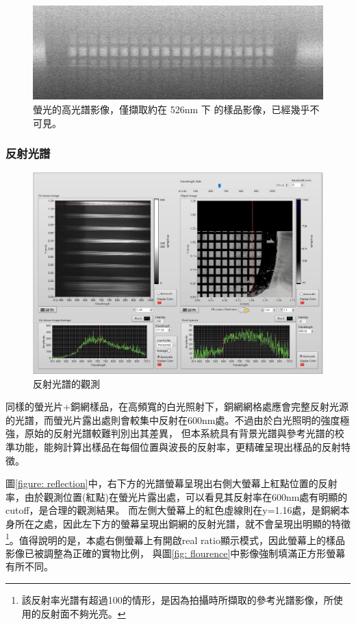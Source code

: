 \documentclass[12pt]{article}
\begin{document}
\begin{figure}
    \centering
    \includegraphics[width = 0.9\linewidth]{1211_10um_15msLaser.tiff137-1.jpg}
    \caption[螢 光 的 高 光 譜 影 像(526nm)]{螢光的高光譜影像，僅擷取約在 526nm 下
    的樣品影像，已經幾乎不可見。}
    \label{fig: flourence526}
\end{figure}

\subsubsection{反射光譜}
\begin{figure}
    \centering
    \includegraphics[width = \linewidth]{reflection (2).jpeg}
    \caption{反射光譜的觀測}
    \label{fig: reflec}
\end{figure}
同樣的螢光片+銅網樣品，在高頻寬的白光照射下，銅網網格處應會完整反射光源的光譜，而螢光片露出處則會較集中反射在600nm處。不過由於白光照明的強度極強，原始的反射光譜較難判別出其差異，
但本系統具有背景光譜與參考光譜的校準功能，能夠計算出樣品在每個位置與波長的反射率，更精確呈現出樣品的反射特徵。

圖\ref{figure: reflection}中，右下方的光譜螢幕呈現出右側大螢幕上紅點位置的反射率，由於觀測位置(紅點)在螢光片露出處，可以看見其反射率在600nm處有明顯的cutoff，是合理的觀測結果。
而左側大螢幕上的紅色虛線則在y=1.16處，是銅網本身所在之處，因此左下方的螢幕呈現出銅網的反射光譜，就不會呈現出明顯的特徵
\footnote{該反射率光譜有超過100的情形，是因為拍攝時所擷取的參考光譜影像，所使用的反射面不夠光亮。}。值得說明的是，本處右側螢幕上有開啟real ratio顯示模式，因此螢幕上的樣品影像已被調整為正確的實物比例，
與圖\ref{fig: flourence}中影像強制填滿正方形螢幕有所不同。
\end{document}
